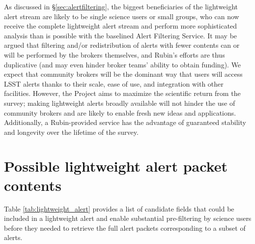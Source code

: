 \documentclass[DM,authoryear,toc]{lsstdoc}
\begin{document}
As discussed in \S \ref{sec:alertfiltering}, the biggest beneficiaries of the lightweight alert stream are likely to be single science users or small groups, who can now receive the complete lightweight alert stream and perform more sophisticated analysis than is possible with the baselined Alert Filtering Service.
It may be argued that filtering and/or redistribution of alerts with fewer contents can or will be performed by the brokers themselves, and Rubin's efforts are thus duplicative (and may even hinder broker teams' ability to obtain funding).
We expect that community brokers will be the dominant way that users will access LSST alerts thanks to their scale, ease of use, and integration with other facilities.
However, the Project aims to maximize the scientific return from the survey; making lightweight alerts broadly available will not hinder the use of community brokers and are likely to enable fresh new ideas and applications.
Additionally, a Rubin-provided service has the advantage of guaranteed stability and longevity over the lifetime of the survey.



\appendix

\section{Possible lightweight alert packet contents} \label{sec:lightweight_contents}

Table \ref{tab:lightweight_alert} provides a list of candidate fields that could be included in a lightweight alert and enable substantial pre-filtering by science users before they needed to retrieve the full alert packets corresponding to a subset of alerts.
\end{document}
